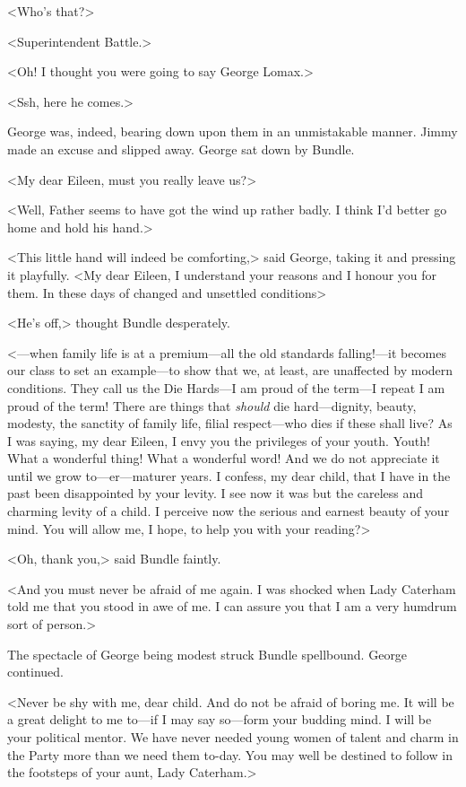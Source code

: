 <Who's that?>

<Superintendent Battle.>

<Oh! I thought you were going to say George Lomax.>

<Ssh, here he comes.>

George was, indeed, bearing down upon them in an unmistakable manner. Jimmy made an excuse and slipped away. George sat down by Bundle.

<My dear Eileen, must you really leave us?>

<Well, Father seems to have got the wind up rather badly. I think I'd better go home and hold his hand.>

<This little hand will indeed be comforting,> said George, taking it and pressing it playfully. <My dear Eileen, I understand your reasons and I honour you for them. In these days of changed and unsettled conditions\longdash>

<He's off,> thought Bundle desperately.

<—when family life is at a premium—all the old standards falling!—it becomes our class to set an example—to show that we, at least, are unaffected by modern conditions. They call us the Die Hards—I am proud of the term—I repeat I am proud of the term! There are things that \emph{should} die hard—dignity, beauty, modesty, the sanctity of family life, filial respect—who dies if these shall live? As I was saying, my dear Eileen, I envy you the privileges of your youth. Youth! What a wonderful thing! What a wonderful word! And we do not appreciate it until we grow to—er—maturer years. I confess, my dear child, that I have in the past been disappointed by your levity. I see now it was but the careless and charming levity of a child. I perceive now the serious and earnest beauty of your mind. You will allow me, I hope, to help you with your reading?>

<Oh, thank you,> said Bundle faintly.

<And you must never be afraid of me again. I was shocked when Lady Caterham told me that you stood in awe of me. I can assure you that I am a very humdrum sort of person.>

The spectacle of George being modest struck Bundle spellbound. George continued.

<Never be shy with me, dear child. And do not be afraid of boring me. It will be a great delight to me to—if I may say so—form your budding mind. I will be your political mentor. We have never needed young women of talent and charm in the Party more than we need them to-day. You may well be destined to follow in the footsteps of your aunt, Lady Caterham.>

